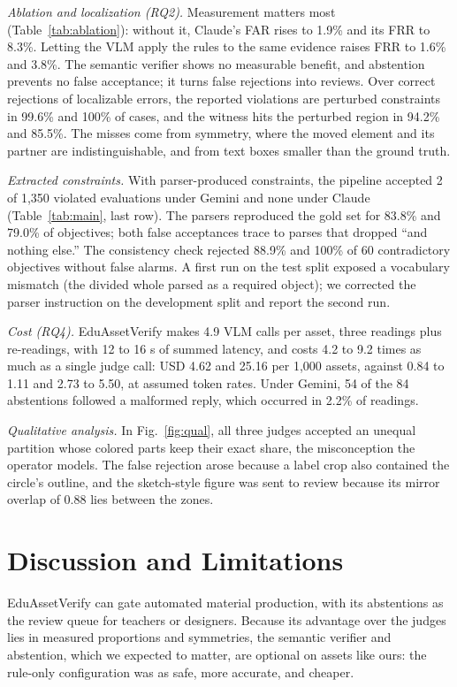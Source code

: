 \documentclass[conference]{IEEEtran}
\begin{document}
\emph{Ablation and localization (RQ2).} Measurement matters most (Table~\ref{tab:ablation}): without it, Claude's FAR rises to 1.9\% and its FRR to 8.3\%. Letting the VLM apply the rules to the same evidence raises FRR to 1.6\% and 3.8\%. The semantic verifier shows no measurable benefit, and abstention prevents no false acceptance; it turns false rejections into reviews. Over correct rejections of localizable errors, the reported violations are perturbed constraints in 99.6\% and 100\% of cases, and the witness hits the perturbed region in 94.2\% and 85.5\%. The misses come from symmetry, where the moved element and its partner are indistinguishable, and from text boxes smaller than the ground truth.

\emph{Extracted constraints.} With parser-produced constraints, the pipeline accepted 2 of 1{,}350 violated evaluations under Gemini and none under Claude (Table~\ref{tab:main}, last row). The parsers reproduced the gold set for 83.8\% and 79.0\% of objectives; both false acceptances trace to parses that dropped ``and nothing else.'' The consistency check rejected 88.9\% and 100\% of 60 contradictory objectives without false alarms. A first run on the test split exposed a vocabulary mismatch (the divided whole parsed as a required object); we corrected the parser instruction on the development split and report the second run.

\emph{Cost (RQ4).} EduAssetVerify makes 4.9 VLM calls per asset, three readings plus re-readings, with 12 to 16 s of summed latency, and costs 4.2 to 9.2 times as much as a single judge call: USD 4.62 and 25.16 per 1{,}000 assets, against 0.84 to 1.11 and 2.73 to 5.50, at assumed token rates. Under Gemini, 54 of the 84 abstentions followed a malformed reply, which occurred in 2.2\% of readings.


\emph{Qualitative analysis.} In Fig.~\ref{fig:qual}, all three judges accepted an unequal partition whose colored parts keep their exact share, the misconception the operator models. The false rejection arose because a label crop also contained the circle's outline, and the sketch-style figure was sent to review because its mirror overlap of 0.88 lies between the zones.

\section{Discussion and Limitations}

EduAssetVerify can gate automated material production, with its abstentions as the review queue for teachers or designers. Because its advantage over the judges lies in measured proportions and symmetries, the semantic verifier and abstention, which we expected to matter, are optional on assets like ours: the rule-only configuration was as safe, more accurate, and cheaper.
\end{document}
